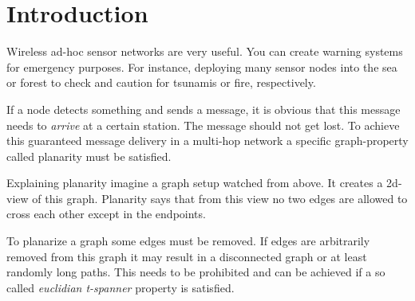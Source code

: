 \section{Introduction}
Wireless ad-hoc sensor networks are very useful. 
You can create warning systems for emergency purposes.
For instance, deploying many sensor nodes into the sea or forest to check and caution for tsunamis or fire, respectively.

If a node detects something and sends a message, it is obvious that this message needs to \emph{arrive} at a certain station.
The message should not get lost.
To achieve this guaranteed message delivery in a multi-hop network a specific graph-property called planarity must be satisfied.

Explaining planarity imagine a graph setup watched from above. 
It creates a 2d-view of this graph.
Planarity says that from this view no two edges are allowed to cross each other except in the endpoints.

To planarize a graph some edges must be removed.
If edges are arbitrarily removed from this graph it may result in a disconnected graph or at least randomly long paths.
This needs to be prohibited and can be achieved if a so called \emph{euclidian t-spanner} property is satisfied.